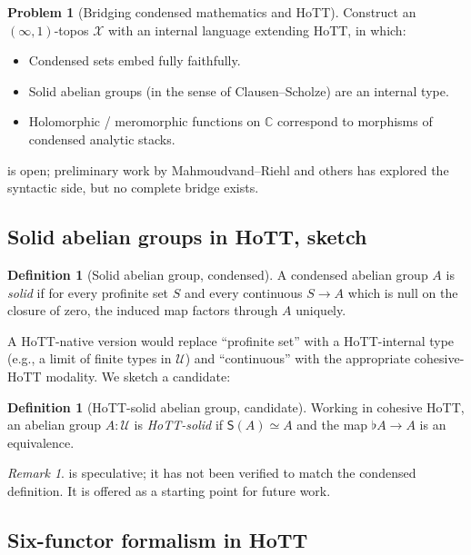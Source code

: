 \documentclass[12pt]{article}
\theoremstyle{definition}
\newtheorem{definition}[theorem]{Definition}
\newtheorem{problem}[theorem]{Problem}
\theoremstyle{remark}
\newtheorem{remark}[theorem]{Remark}
\newcommand{\C}{\mathbb{C}}
\newcommand{\esh}{\mathsf{S}}      %
\begin{document}
\begin{problem}[Bridging condensed mathematics and HoTT]\label{prob:bridge}
Construct an $(\infty,1)$-topos $\mathcal{X}$ with an internal language
extending HoTT, in which:
\begin{itemize}
\item Condensed sets embed fully faithfully.
\item Solid abelian groups (in the sense of Clausen--Scholze) are an
internal type.
\item Holomorphic / meromorphic functions on $\C$ correspond to morphisms
of condensed analytic stacks.
\end{itemize}
\end{problem}

 is open; preliminary work by Mahmoudvand--Riehl and others
has explored the syntactic side, but no complete bridge exists.

\subsection{Solid abelian groups in HoTT, sketch}

\begin{definition}[Solid abelian group, condensed]
A condensed abelian group $A$ is \emph{solid} if for every profinite set
$S$ and every continuous $S \to A$ which is null on the closure of zero,
the induced map factors through $A$ uniquely.
\end{definition}

A HoTT-native version would replace ``profinite set'' with a HoTT-internal
type (e.g., a limit of finite types in $\mathcal{U}$) and ``continuous''
with the appropriate cohesive-HoTT modality. We sketch a candidate:

\begin{definition}[HoTT-solid abelian group, candidate]\label{def:HoTTSolid}
Working in cohesive HoTT, an abelian group $A:\mathcal{U}$ is \emph{HoTT-solid}
if $\esh(A) \simeq A$ and the map $\flat A \to A$ is an equivalence.
\end{definition}

\begin{remark}
 is speculative; it has not been verified to match the
condensed definition. It is offered as a starting point for future work.
\end{remark}

\subsection{Six-functor formalism in HoTT}\label{subsec:sixfunctor}
\end{document}
